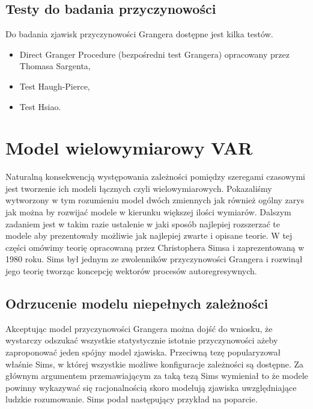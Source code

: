 \documentclass[10pt,a4paper]{book}
\begin{document}
\subsection{Testy do badania przyczynowości}

Do badania zjawisk przyczynowości Grangera dostępne jest kilka testów.

\begin{itemize}
\item Direct Granger Procedure (bezpośredni test Grangera) opracowany przez Thomasa Sargenta,
\item Test Haugh-Pierce, 
\item Test Hsiao.
\end{itemize}

\section{Model wielowymiarowy VAR}

Naturalną konsekwencją występowania zależności pomiędzy szeregami czasowymi jest tworzenie ich modeli łącznych czyli wielowymiarowych. Pokazaliśmy wytworzony w tym rozumieniu model dwóch zmiennych jak również ogólny zarys jak można by rozwijać modele w kierunku większej ilości wymiarów. Dalszym zadaniem jest w takim razie ustalenie w jaki sposób najlepiej rozszerzać te modele aby prezentowały możliwie jak najlepiej zwarte i opisane teorie. W tej części omówimy teorię opracowaną przez Christophera Simsa i zaprezentowaną w 1980 roku. Sims był jednym ze zwolenników przyczynowości Grangera i rozwinął jego teorię tworząc koncepcję wektorów procesów autoregresywnych. 

\subsection{Odrzucenie modelu niepełnych zależności}

Akceptując model przyczynowości Grangera można dojść do wniosku, że wystarczy odszukać wszystkie statystycznie istotnie przyczynowości ażeby zaproponować jeden spójny model zjawiska. Przeciwną tezę popularyzował właśnie Sims, w której wszystkie możliwe konfiguracje zależności są dostępne. Za głównym argumentem przemawiającym za taką tezą Sims wymieniał to że modele powinny wykazywać się racjonalnością skoro modelują zjawiska uwzględniające ludzkie rozumowanie. Sims podał następujący przykład na poparcie.
\end{document}
